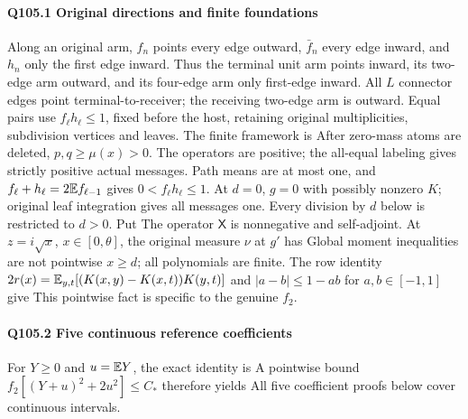 \paragraph{Q105.1 Original directions and finite foundations}\label{part:Q105.1}
Along an original arm, $f_n$ points every edge outward, $\bar f_n$ every
edge inward, and $h_n$ only the first edge inward.
Thus the terminal unit arm points inward, its two-edge arm outward,
and its four-edge arm only first-edge inward.
All $L$ connector edges point terminal-to-receiver; the receiving two-edge
arm is outward. Equal pairs use $f_\ell h_\ell\le\allowbreak 1$, fixed before the host,
retaining original multiplicities, subdivision vertices and leaves.
The finite framework is
After zero-mass atoms are deleted, $p,\allowbreak q\ge\allowbreak \mu(x)>\allowbreak 0$.
The operators are positive; the all-equal labeling gives strictly positive
actual messages. Path means are at most one, and
$f_\ell+h_\ell=\allowbreak 2\mathbb E f_{\ell-1}$ gives $0<\allowbreak f_\ell h_\ell\le\allowbreak 1$.
At $d=\allowbreak 0$, $g=\allowbreak 0$ with possibly nonzero $K$; original leaf integration
gives all messages one. Every division by $d$ below is restricted to $d>\allowbreak 0$.
Put
The operator $\mathsf X$ is nonnegative and self-adjoint.
At $z=\allowbreak i\sqrt x$, $x\in[0,\allowbreak \theta]$, the original measure $\nu$ at $g'$ has
Global moment inequalities are not pointwise $x\ge\allowbreak  d$; all polynomials
are finite. The row identity
$2r(x)=\allowbreak \mathbb E_{y,\allowbreak t}[(K(x,\allowbreak y)-K(x,\allowbreak t))K(y,\allowbreak t)]$ and
$|a-b|\le\allowbreak 1-ab$ for $a,\allowbreak b\in[-1,\allowbreak 1]$ give
This pointwise fact is specific to the genuine $f_2$.

\paragraph{Q105.2 Five continuous reference coefficients}\label{part:Q105.2}
For $Y\ge\allowbreak 0$ and $u=\allowbreak \mathbb E Y$, the exact identity is
A pointwise bound $f_2[(Y+u)^2+2u^2]\le\allowbreak  C_*$ therefore yields
All five coefficient proofs below cover continuous intervals.

